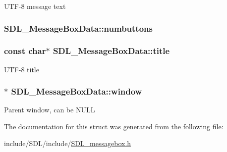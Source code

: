 U\-T\-F-\/8 message text \hypertarget{struct_s_d_l___message_box_data_a133f4fef549cc0cb14b799af35f3dc5a}{
\subsubsection[{numbuttons}]{ S\-D\-L\-\_\-\-Message\-Box\-Data\-::numbuttons}}\label{struct_s_d_l___message_box_data_a133f4fef549cc0cb14b799af35f3dc5a}
\hypertarget{struct_s_d_l___message_box_data_a93ceeafeed20b553ad4c86c9be37f117}{
\subsubsection[{title}]{\setlength{\rightskip}{0pt plus 5cm}const char$\ast$ S\-D\-L\-\_\-\-Message\-Box\-Data\-::title}}\label{struct_s_d_l___message_box_data_a93ceeafeed20b553ad4c86c9be37f117}
U\-T\-F-\/8 title \hypertarget{struct_s_d_l___message_box_data_a5c333bc93705c66068e140bc28daedcb}{
\subsubsection[{window}]{$\ast$ S\-D\-L\-\_\-\-Message\-Box\-Data\-::window}}\label{struct_s_d_l___message_box_data_a5c333bc93705c66068e140bc28daedcb}
Parent window, can be N\-U\-L\-L 

The documentation for this struct was generated from the following file\-:\begin{DoxyCompactItemize}
\item 
include/\-S\-D\-L/include/\hyperlink{_s_d_l__messagebox_8h}{S\-D\-L\-\_\-messagebox.\-h}\end{DoxyCompactItemize}

